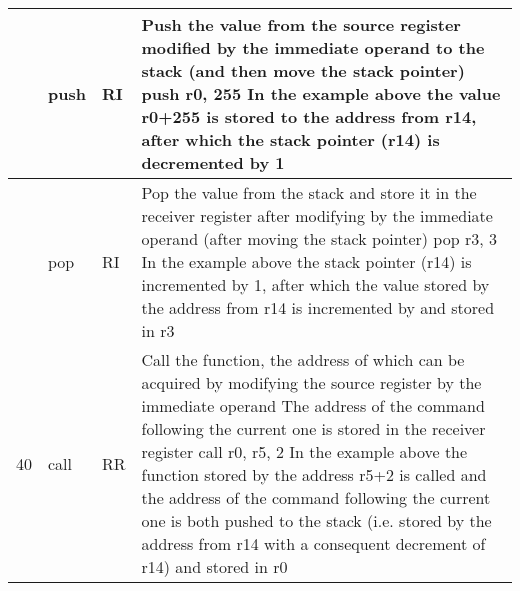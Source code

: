 \documentclass{article}
\newcommand{\St}[1]{{\fontfamily{qcr}\selectfont #1}}
\newcommand{\Ss}[1]{{\fontfamily{cmss}\selectfont #1}}
\begin{document}
{
\renewcommand{\arraystretch}{1.4}
\begin{table*}[h!]
\centering
\vspace{2mm}
\centering
\begin{tabular}{| >{\centering\arraybackslash} m{1cm} | >{\centering\arraybackslash} m{1.4cm} | >{\centering\arraybackslash} m{1.2cm} | m{11.6cm} |}

 \hline
 
 38 & \St{push} & \Ss{RI} &
 
 Push the value from the source register modified by the immediate operand \newline 
 to the stack (and then move the stack pointer) \newline
 \St{push r0, 255} \newline
 In the example above the value \St{r0+255} is stored to the address from \St{r14}, \newline
 after which the stack pointer (\St{r14}) is decremented by 1\\
 
 \hline
 
 39 & \St{pop} & \Ss{RI} &
 
 Pop the value from the stack and store it in the receiver register after \newline
 modifying by the immediate operand (after moving the stack pointer) \newline 
 \St{pop r3, 3} \newline
 In the example above the stack pointer (\St{r14}) is incremented by 1, \newline
 after which the value stored by the address from \St{r14} is incremented by \St{3} \newline
 and stored in \St{r3} \\
 
 \hline
 
 40 & \St{call} & \Ss{RR} &
 
 Call the function, the address of which can be acquired by modifying \newline
 the source register by the immediate operand \newline
 The address of the command following the current one is stored \newline
 in the receiver register \newline 
 \St{call r0, r5, 2} \newline
 In the example above the function stored by the address \St{r5+2} is called and \newline
 the address of the command following the current one is both pushed to the \newline
 stack (i.e. stored by the address from \St{r14} with a consequent decrement of \newline
 \St{r14}) and stored in \St{r0} \\
 

\end{tabular}
\end{table*}}
\end{document}

